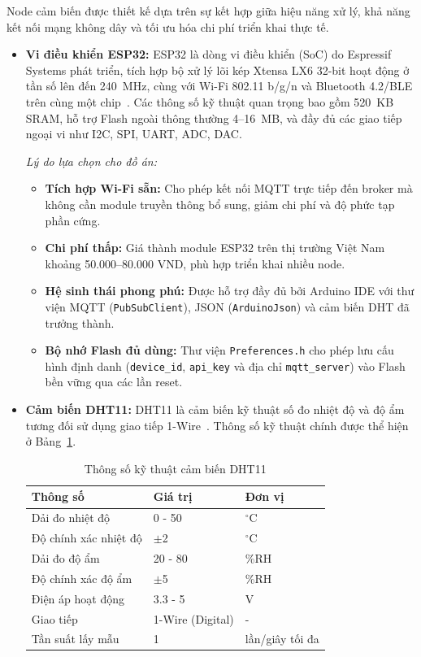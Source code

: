 Node cảm biến được thiết kế dựa trên sự kết hợp giữa hiệu năng xử lý, khả năng kết nối mạng không dây và tối ưu hóa chi phí triển khai thực tế.
\begin{itemize}[leftmargin=2cm]
  \item \textbf{Vi điều khiển ESP32:} ESP32 là dòng vi điều khiển (SoC) do Espressif Systems phát triển, tích hợp bộ xử lý lõi kép Xtensa LX6 32-bit hoạt động ở tần số lên đến 240~MHz, cùng với Wi-Fi 802.11 b/g/n và Bluetooth 4.2/BLE trên cùng một chip~\cite{espressif2024esp32}. Các thông số kỹ thuật quan trọng bao gồm 520~KB SRAM, hỗ trợ Flash ngoài thông thường 4--16~MB, và đầy đủ các giao tiếp ngoại vi như I2C, SPI, UART, ADC, DAC.
  
  \textit{Lý do lựa chọn cho đồ án:}
  \begin{itemize}
    \item \textbf{Tích hợp Wi-Fi sẵn:} Cho phép kết nối MQTT trực tiếp đến broker mà không cần module truyền thông bổ sung, giảm chi phí và độ phức tạp phần cứng.
    \item \textbf{Chi phí thấp:} Giá thành module ESP32 trên thị trường Việt Nam khoảng 50.000--80.000 VND, phù hợp triển khai nhiều node.
    \item \textbf{Hệ sinh thái phong phú:} Được hỗ trợ đầy đủ bởi Arduino IDE với thư viện MQTT (\texttt{PubSubClient}), JSON (\texttt{ArduinoJson}) và cảm biến DHT đã trưởng thành.
    \item \textbf{Bộ nhớ Flash đủ dùng:} Thư viện \texttt{Preferences.h} cho phép lưu cấu hình định danh (\texttt{device\_id}, \texttt{api\_key} và địa chỉ \texttt{mqtt\_server}) vào Flash bền vững qua các lần reset.
  \end{itemize}

  \item \textbf{Cảm biến DHT11:} DHT11 là cảm biến kỹ thuật số đo nhiệt độ và độ ẩm tương đối sử dụng giao tiếp 1-Wire~\cite{dht11datasheet}. Thông số kỹ thuật chính được thể hiện ở Bảng~\ref{tab:dht11_spec}.
  
  \begin{table}[H]
    \centering
    \caption{Thông số kỹ thuật cảm biến DHT11}
    \label{tab:dht11_spec}
    \begin{tabular}{lll}
      \toprule
      \textbf{Thông số} & \textbf{Giá trị} & \textbf{Đơn vị} \\
      \midrule
      Dải đo nhiệt độ   & 0 - 50          & $^\circ$C       \\
      Độ chính xác nhiệt độ & $\pm$2       & $^\circ$C       \\
      Dải đo độ ẩm      & 20 - 80         & \%RH            \\
      Độ chính xác độ ẩm & $\pm$5          & \%RH            \\
      Điện áp hoạt động & 3.3 - 5         & V               \\
      Giao tiếp         & 1-Wire (Digital) & -             \\
      Tần suất lấy mẫu  & 1                & lần/giây tối đa \\
      \bottomrule
    \end{tabular}
  \end{table}


\end{itemize}
